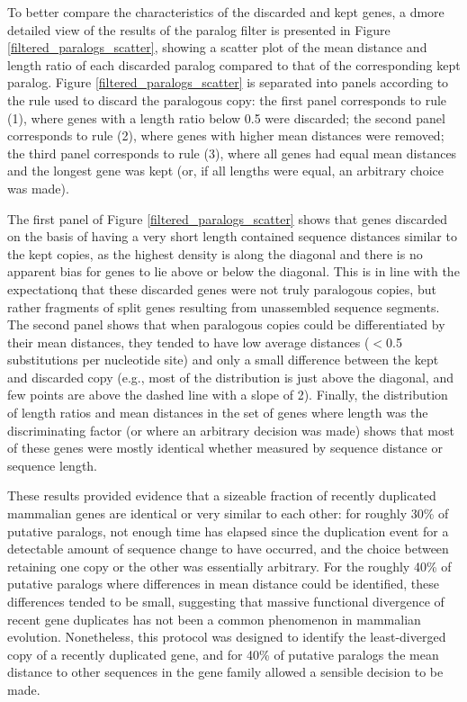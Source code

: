 To better compare the characteristics of the discarded and kept genes,
a dmore detailed view of the results of the paralog filter is
presented in Figure \ref{filtered_paralogs_scatter}, showing a scatter
plot of the mean distance and length ratio of each discarded paralog
compared to that of the corresponding kept paralog. Figure
\ref{filtered_paralogs_scatter} is separated into panels according to
the rule used to discard the paralogous copy: the first panel
corresponds to rule (1), where genes with a length ratio below 0.5
were discarded; the second panel corresponds to rule (2), where genes
with higher mean distances were removed; the third panel corresponds
to rule (3), where all genes had equal mean distances and the longest
gene was kept (or, if all lengths were equal, an arbitrary choice was
made).

The first panel of Figure \ref{filtered_paralogs_scatter} shows that
genes discarded on the basis of having a very short length contained
sequence distances similar to the kept copies, as the highest density
is along the diagonal and there is no apparent bias for genes to lie
above or below the diagonal. This is in line with the expectationq
that these discarded genes were not truly paralogous copies, but
rather fragments of split genes resulting from unassembled sequence
segments. The second panel shows that when paralogous copies could be
differentiated by their mean distances, they tended to have low
average distances ($<$0.5 substitutions per nucleotide site) and only
a small difference between the kept and discarded copy (e.g., most of
the distribution is just above the diagonal, and few points are above
the dashed line with a slope of 2). Finally, the distribution of
length ratios and mean distances in the set of genes where length was
the discriminating factor (or where an arbitrary decision was made)
shows that most of these genes were mostly identical whether measured
by sequence distance or sequence length.

These results provided evidence that a sizeable fraction of recently
duplicated mammalian genes are identical or very similar to each
other: for roughly 30\% of putative paralogs, not enough time has
elapsed since the duplication event for a detectable amount of
sequence change to have occurred, and the choice between retaining one
copy or the other was essentially arbitrary. For the roughly 40\% of
putative paralogs where differences in mean distance could be
identified, these differences tended to be small, suggesting that
massive functional divergence of recent gene duplicates has not been a
common phenomenon in mammalian evolution. Nonetheless, this protocol
was designed to identify the least-diverged copy of a recently
duplicated gene, and for 40\% of putative paralogs the mean distance
to other sequences in the gene family allowed a sensible decision to
be made.

